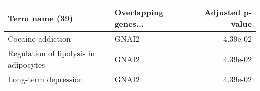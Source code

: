\begin{tabular}{llr}
\toprule
                       Term name (39) & Overlapping genes... &  Adjusted p-value \\
\midrule
                    Cocaine addiction &                GNAI2 &          4.39e-02 \\
Regulation of lipolysis in adipocytes &                GNAI2 &          4.39e-02 \\
                 Long-term depression &                GNAI2 &          4.39e-02 \\
\bottomrule
\end{tabular}
